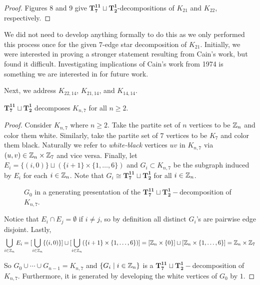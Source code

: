 \begin{proof}
     Figures 8 and 9 give $\mathbf{T_{7}^{11}}\sqcup\mathbf{T_{2}^{1}}$-decompositions of $K_{21}$ and $K_{22}$, respectively.%

\end{proof}
We did not need to develop anything formally to do this as we only performed this process once for the given $7$-edge star decomposition of $K_{21}$. Initially, we were interested in proving a stronger statement resulting from Cain's work, but found it difficult. Investigating implications of Cain's work \cite{Cain1974} from 1974 is something we are interested in for future work.

Next, we address $K_{22,14}$, $K_{21,14}$, and $K_{14,14}$. 
\newpage
\begin{thm} \label{thm:K_n,7}
    $\mathbf{T_{7}^{11}}\sqcup\mathbf{T_{2}^{1}}$ decomposes $K_{n,7}$ for all $n\geq 2$.
\end{thm}

\begin{proof}
    Consider $K_{n,7}$ where $n\geq 2$. Take the partite set of $n$ vertices to be $\mathbb{Z}_{n}$ and color them white. Similarly, take the partite set of $7$ vertices to be $K_{7}$ and color them black. Naturally we refer to \textit{white-black} vertices $uv$ in $K_{n,7}$ via $(u,v)\in \mathbb{Z}_{n}\times\mathbb{Z}_{7}$ and vice versa. Finally, let $E_{i}=\{(i,0)\}\sqcup (\{i+1\}\times \{1,\hdots,6\})$ and $G_{i}\subset K_{n,7}$ be the subgraph induced by $E_{i}$ for each $i\in \mathbb{Z}_{n}$. Note that $G_{i}\cong \mathbf{T_{7}^{11}}\sqcup\mathbf{T_{2}^{1}}$ for all $i\in \mathbb{Z}_{n}$.

    \begin{figure}[H]
        \centering
        
        \caption{$G_{0}$ in a generating presentation of the $\mathbf{T_{7}^{11}}\sqcup\mathbf{T_{2}^{1}}-$decomposition of $K_{n,7}$.}
        \label{fig:starpathbip}
    \end{figure}

    \noindent Notice that $E_{i}\cap E_{j}=\emptyset$ if $i\neq j$, so by definition all distinct $G_{i}$'s are pairwise edge disjoint. Lastly,
    $$\bigcup_{i\in \mathbb{Z}_{n}} E_{i}=[\bigcup_{i\in \mathbb{Z}_{n}} \{(i,0)\}]\sqcup [\bigcup_{i\in \mathbb{Z}_{n}} (\{i+1\}\times \{1,\hdots, 6\})]=[\mathbb{Z}_{n}\times \{0\}]\sqcup [\mathbb{Z}_{n}\times \{1,\hdots, 6\}]=\mathbb{Z}_{n}\times \mathbb{Z}_{7}$$
    
    \noindent So $G_{0}\cup \cdots \cup G_{n-1}=K_{n,7}$ and $\{G_{i}\mid i\in \mathbb{Z}_{n}\}$ is a $\mathbf{T_{7}^{11}}\sqcup\mathbf{T_{2}^{1}}-$decomposition of $K_{n,7}$. Furthermore, it is generated by developing the white vertices of $G_{0}$ by $1$.
\end{proof}

